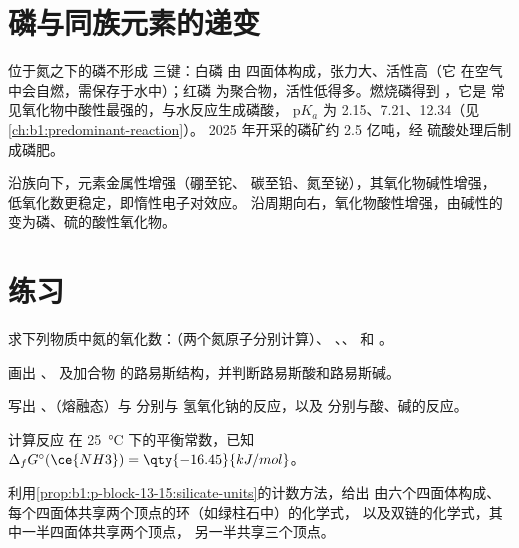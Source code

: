 \section{磷与同族元素的递变}

位于氮之下的磷不形成  三键：白磷
由  四面体构成，张力大、活性高（它
在空气中会自燃，需保存于水中）；红磷
为聚合物，活性低得多。燃烧磷得到 ，它是
常见氧化物中酸性最强的，与水反应生成磷酸，
$\mathrm{p}K_a$ 为 2.15、7.21、12.34（见\cref{ch:b1:predominant-reaction}）。
2025 年开采的磷矿约 2.5 亿吨，经
硫酸处理后制成磷肥。

沿族向下，元素金属性增强（硼至铊、
碳至铅、氮至铋），其氧化物碱性增强，
低氧化数更稳定，即惰性电子对效应。
沿周期向右，氧化物酸性增强，由碱性的 
变为磷、硫的酸性氧化物。

\section{练习}

\begin{exercise}[$\star$]\label{exo:b1:p-block-13-15:1}
求下列物质中氮的氧化数：（两个氮原子分别计算）、
、、 和 。
\end{exercise}

\begin{exercise}[$\star$]\label{exo:b1:p-block-13-15:2}
画出 、 及加合物
 的路易斯结构，并判断路易斯酸和路易斯碱。
\end{exercise}

\begin{exercise}[$\star$]\label{exo:b1:p-block-13-15:3}
写出 、（熔融态）与  分别与
氢氧化钠的反应，以及  分别与酸、碱的反应。
\end{exercise}

\begin{exercise}[$\star$]\label{exo:b1:p-block-13-15:4}
计算反应  在
\qty{25}{\celsius} 下的平衡常数，已知 $\Delta_f G^\circ(\ce{NH3}) =
\qty{-16.45}{kJ/mol}$。
\end{exercise}

\begin{exercise}[$\star\star$]\label{exo:b1:p-block-13-15:5}
利用\cref{prop:b1:p-block-13-15:silicate-units}的计数方法，给出
由六个四面体构成、每个四面体共享两个顶点的环（如绿柱石中）的化学式，
以及双链的化学式，其中一半四面体共享两个顶点，
另一半共享三个顶点。
\end{exercise}

